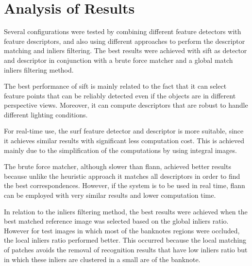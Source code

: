 \section{Analysis of Results}\label{sec:results-analysis}

Several configurations were tested by combining different feature detectors with feature descriptors, and also using different approaches to perform the descriptor matching and inliers filtering. The best results were achieved with \gls{sift} as detector and descriptor in conjunction with a brute force matcher and a global match inliers filtering method.

The best performance of \gls{sift} is mainly related to the fact that it can select feature points that can be reliably detected even if the objects are in different perspective views. Moreover, it can compute descriptors that are robust to handle different lighting conditions.

For real-time use, the \gls{surf} feature detector and descriptor is more suitable, since it achieves similar results with significant less computation cost. This is achieved mainly due to the simplification of the computations by using integral images.

The brute force matcher, although slower than \gls{flann}, achieved better results because unlike the heuristic approach it matches all descriptors in order to find the best correspondences. However, if the system is to be used in real time, \gls{flann} can be employed with very similar results and lower computation time.

In relation to the inliers filtering method, the best results were achieved when the best matched reference image was selected based on the global inliers ratio. However for test images in which most of the banknotes regions were occluded, the local inliers ratio performed better. This occurred because the local matching of patches avoids the removal of recognition results that have low inliers ratio but in which these inliers are clustered in a small are of the banknote.
